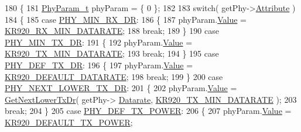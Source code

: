 \begin{DoxyCode}
180 \{
181     \mbox{\hyperlink{unionu_phy_param}{PhyParam\_t}} phyParam = \{ 0 \};
182 
183     \textcolor{keywordflow}{switch}( getPhy->\mbox{\hyperlink{structs_get_phy_params_abdcb168ffd6913b85e2f635d7a475f2d}{Attribute}} )
184     \{
185         \textcolor{keywordflow}{case} \mbox{\hyperlink{group___r_e_g_i_o_n_gga51cbe8f5433d914fe9cf81b451de2c2da91cb5d84f937c32cd635dd7efe7a9d3a}{PHY\_MIN\_RX\_DR}}:
186         \{
187             phyParam.\mbox{\hyperlink{unionu_phy_param_a8e0dcce3428a8051614e852b8836d0d1}{Value}} = \mbox{\hyperlink{group___r_e_g_i_o_n_k_r920_ga07e6cd760fe7f1fc3a572fdf20ceebb6}{KR920\_RX\_MIN\_DATARATE}};
188             \textcolor{keywordflow}{break};
189         \}
190         \textcolor{keywordflow}{case} \mbox{\hyperlink{group___r_e_g_i_o_n_gga51cbe8f5433d914fe9cf81b451de2c2daace3e56c88b40def8ed6a9106871e7de}{PHY\_MIN\_TX\_DR}}:
191         \{
192             phyParam.\mbox{\hyperlink{unionu_phy_param_a8e0dcce3428a8051614e852b8836d0d1}{Value}} = \mbox{\hyperlink{group___r_e_g_i_o_n_k_r920_ga9eff66e6e0242d6a7563dd346a56e3ab}{KR920\_TX\_MIN\_DATARATE}};
193             \textcolor{keywordflow}{break};
194         \}
195         \textcolor{keywordflow}{case} \mbox{\hyperlink{group___r_e_g_i_o_n_gga51cbe8f5433d914fe9cf81b451de2c2da70c3923333165960549162e3dcf10467}{PHY\_DEF\_TX\_DR}}:
196         \{
197             phyParam.\mbox{\hyperlink{unionu_phy_param_a8e0dcce3428a8051614e852b8836d0d1}{Value}} = \mbox{\hyperlink{group___r_e_g_i_o_n_k_r920_ga574a2f448e5bde55946a05487bcc6de4}{KR920\_DEFAULT\_DATARATE}};
198             \textcolor{keywordflow}{break};
199         \}
200         \textcolor{keywordflow}{case} \mbox{\hyperlink{group___r_e_g_i_o_n_gga51cbe8f5433d914fe9cf81b451de2c2dac002e7e492cf30dbf9c544b062f5cc8a}{PHY\_NEXT\_LOWER\_TX\_DR}}:
201         \{
202             phyParam.\mbox{\hyperlink{unionu_phy_param_a8e0dcce3428a8051614e852b8836d0d1}{Value}} = \mbox{\hyperlink{_region_k_r920_8c_ae06574681e2f7c3f3e604878c81743aa}{GetNextLowerTxDr}}( getPhy->
      \mbox{\hyperlink{structs_get_phy_params_ae2f6080f3aa0e9485c55513ca56bb24d}{Datarate}}, \mbox{\hyperlink{group___r_e_g_i_o_n_k_r920_ga9eff66e6e0242d6a7563dd346a56e3ab}{KR920\_TX\_MIN\_DATARATE}} );
203             \textcolor{keywordflow}{break};
204         \}
205         \textcolor{keywordflow}{case} \mbox{\hyperlink{group___r_e_g_i_o_n_gga51cbe8f5433d914fe9cf81b451de2c2da18ae0d314f20c212f9e40207099ab1bb}{PHY\_DEF\_TX\_POWER}}:
206         \{
207             phyParam.\mbox{\hyperlink{unionu_phy_param_a8e0dcce3428a8051614e852b8836d0d1}{Value}} = \mbox{\hyperlink{group___r_e_g_i_o_n_k_r920_ga2d050aba7ed77d79eb65e2be94ca9abe}{KR920\_DEFAULT\_TX\_POWER}};

\end{DoxyCode}
